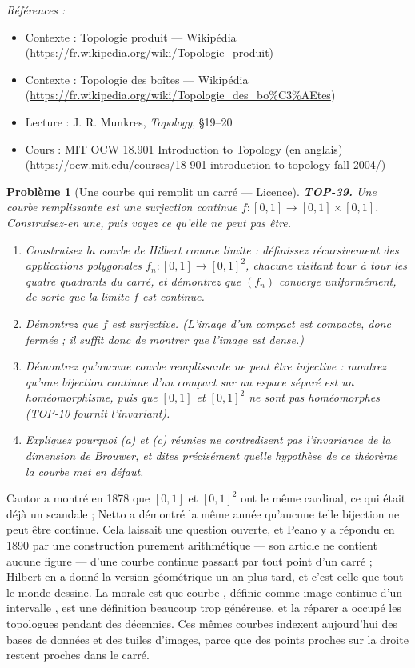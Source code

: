 \documentclass[11pt]{article}
\newtheorem{problem}{Problème}
\newenvironment{refs}{\par\small\noindent\emph{Références :}\begin{itemize}\setlength\itemsep{0pt}}{\end{itemize}\normalsize}
\begin{document}
\begin{refs}
\item Contexte : Topologie produit --- Wikipédia (\url{https://fr.wikipedia.org/wiki/Topologie_produit})
\item Contexte : Topologie des boîtes --- Wikipédia (\url{https://fr.wikipedia.org/wiki/Topologie_des_bo%C3%AEtes})
\item Lecture : J. R. Munkres, \textit{Topology}, \S{}19--20
\item Cours : MIT OCW 18.901 Introduction to Topology (en anglais) (\url{https://ocw.mit.edu/courses/18-901-introduction-to-topology-fall-2004/})
\end{refs}

\bigskip

\begin{problem}[{Une courbe qui remplit un carré --- Licence}]
\textbf{TOP-39.} Une \textit{courbe remplissante} est une surjection continue
$ f : [0,1] \to [0,1] \times [0,1] $. Construisez-en une, puis voyez ce qu'elle ne peut pas
être.
\begin{enumerate}
\item[(a)] Construisez la courbe de Hilbert comme limite : définissez récursivement des applications
polygonales $ f_n : [0,1] \to [0,1]^2 $, chacune visitant tour à tour les quatre quadrants du carré,
et démontrez que $ (f_n) $ converge uniformément, de sorte que la limite $ f $ est continue.
\item[(b)] Démontrez que $ f $ est surjective. (L'image d'un compact est compacte, donc fermée ; il suffit
donc de montrer que l'image est dense.)
\item[(c)] Démontrez qu'aucune courbe remplissante ne peut être injective : montrez qu'une bijection continue
d'un compact sur un espace séparé est un homéomorphisme, puis que $ [0,1] $ et $ [0,1]^2 $ ne sont
pas homéomorphes (TOP-10 fournit l'invariant).
\item[(d)] Expliquez pourquoi (a) et (c) réunies ne contredisent pas l'invariance de la dimension de Brouwer,
et dites précisément quelle hypothèse de ce théorème la courbe met en défaut.
\end{enumerate}

\end{problem}

\noindent Cantor a montré en 1878 que $ [0,1] $ et $ [0,1]^2 $ ont le même cardinal, ce qui
était déjà un scandale ; Netto a démontré la même année qu'aucune telle bijection ne peut être continue.
Cela laissait une question ouverte, et Peano y a répondu en 1890 par une construction purement
arithmétique --- son article ne contient aucune figure --- d'une courbe continue passant par tout point d'un
carré ; Hilbert en a donné la version géométrique un an plus tard, et c'est celle que tout le monde
dessine. La morale est que \og{} courbe \fg{}, définie comme \og{} image continue d'un intervalle \fg{}, est une
définition beaucoup trop généreuse, et la réparer a occupé les topologues pendant des décennies. Ces mêmes
courbes indexent aujourd'hui des bases de données et des tuiles d'images, parce que des points proches sur
la droite restent proches dans le carré.
\end{document}
